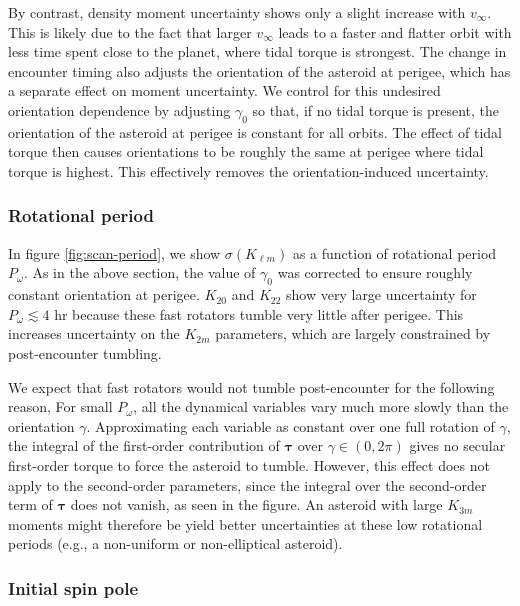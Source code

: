 \documentclass[fleqn,usenatbib]{mnras}
\begin{document}
By contrast, density moment uncertainty shows only a slight increase with $v_\infty$. This is likely due to the fact that larger $v_\infty$ leads to a faster and flatter orbit with less time spent close to the planet, where tidal torque is strongest. The change in encounter timing also adjusts the orientation of the asteroid at perigee, which has a separate effect on moment uncertainty. We control for this undesired orientation dependence by adjusting $\gamma_0$ so that, if no tidal torque is present, the orientation of the asteroid at perigee is constant for all orbits. The effect of tidal torque then causes orientations to be roughly the same at perigee where tidal torque is highest. This effectively removes the orientation-induced uncertainty.

\subsubsection{Rotational period}
\label{sec:scan-period}

In figure \ref{fig:scan-period}, we show $\sigma(K_{\ell m})$ as a function of rotational period $P_\omega$. As in the above section, the value of $\gamma_0$ was corrected to ensure roughly constant orientation at perigee. $K_{20}$ and $K_{22}$ show very large uncertainty for $P_\omega \lesssim 4$ hr because these fast rotators tumble very little after perigee. This increases uncertainty on the $K_{2m}$ parameters, which are largely constrained by post-encounter tumbling.

We expect that fast rotators would not tumble post-encounter for the following reason, For small $P_\omega$, all the dynamical variables vary much more slowly than the orientation $\gamma$. Approximating each variable as constant over one full rotation of $\gamma$, the integral of the first-order contribution of $\bm \tau$ over $\gamma \in (0, 2\pi)$ gives no secular first-order torque to force the asteroid to tumble. However, this effect does not apply to the second-order parameters, since the integral over the second-order term of $\bm \tau$ does not vanish, as seen in the figure. An asteroid with large $K_{3m}$ moments might therefore be yield better uncertainties at these low rotational periods (e.g., a non-uniform or non-elliptical asteroid).


\subsubsection{Initial spin pole}
\label{sec:scan-spin}
\end{document}

